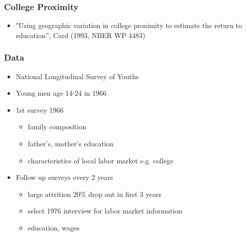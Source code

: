 \documentclass[pdftex]{beamer}
\begin{document}





\begin{frame}
\frametitle{College Proximity}
\begin{itemize}
\item "Using geographic variation in college proximity to estimate the return to education'', Card (1993, NBER WP 4483)
\end{itemize}
\end{frame}


\begin{frame}
\frametitle{Data}

\begin{itemize}
\item National Longitudinal Survey of Youths
\item Young men age 14-24 in 1966
\item 1st survey 1966
	\begin{itemize}
      \item family composition
       \item father's, mother's education
       \item characteristics of local labor market e.g. college
      \end{itemize}
\item Follow up surveys every 2 years
	\begin{itemize}
      \item large attrition 20\% drop out in first 3 years
       \item select 1976 interview for labor market information
       \item education, wages
      \end{itemize}
      \end{itemize}

\end{frame}
\end{document}
